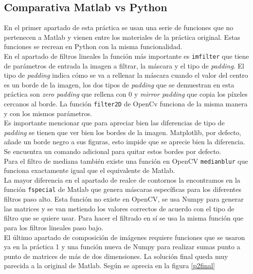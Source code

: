 \subsection{Comparativa Matlab vs Python}

En el primer apartado de esta práctica se usan una serie de funciones que no pertenecen a Matlab y vienen entre los materiales de la práctica original. Estas funciones se recrean en Python con la misma funcionalidad.\\

En el apartado de filtros lineales la función más importante es \texttt{imfilter} que tiene de parámetros de entrada la imagen a filtrar, la máscara y el tipo de \emph{padding}. El tipo de \emph{padding} indica cómo se va a rellenar la máscara cuando el valor del centro es un borde de la imagen, los dos tipos de \emph{padding} que se demuestran en esta práctica son \emph{zero padding} que rellena con 0 y \emph{mirror padding} que copia los píxeles cercanos al borde. La función \texttt{filter2D} de OpenCv funciona de la misma manera y con los mismos parámetros.\\

Es importante mencionar que para apreciar bien las diferencias de tipo de \emph{padding} se tienen que ver bien los bordes de la imagen. Matplotlib, por defecto, añade un borde negro a sus figuras, esto impide que se aprecie bien la diferencia. Se encuentra un comando adicional para quitar estos bordes por defecto.\\

Para el filtro de mediana también existe una función en OpenCV \texttt{medianblur} que funciona exactamente igual que el equivalente de Matlab.\\

La mayor diferencia en el apartado de realce de contornos la encontramos en la función \texttt{fspecial} de Matlab que genera máscaras específicas para los diferentes filtros paso alto. Esta función no existe en OpenCV, se usa Numpy para generar las matrices y se van metiendo los valores correctos de acuerdo con el tipo de filtro que se quiere usar. Para hacer el filtrado en sí se usa la misma función que para los filtros lineales paso bajo.\\

El último apartado de composición de imágenes requiere funciones que se usaron ya en la práctica 1 y una función nueva de Numpy para realizar sumas punto a punto de matrices de más de dos dimensiones. La solución final queda muy parecida a la original de Matlab. Según se aprecia en la figura \ref {p2final}\\


